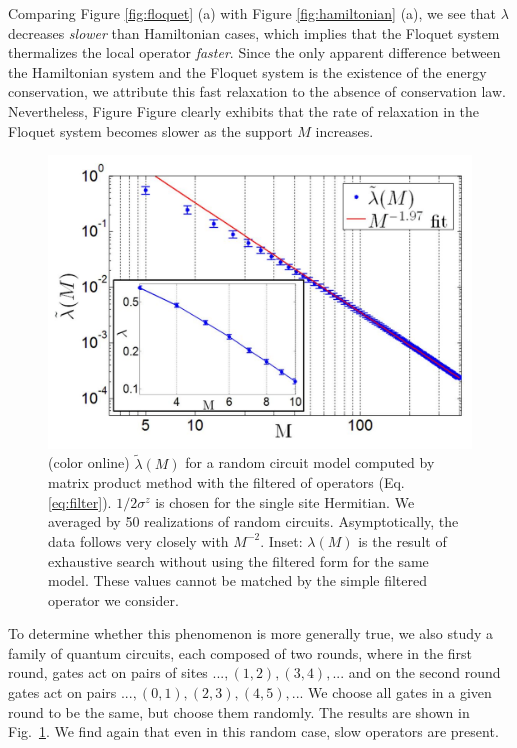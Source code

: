 \documentclass[twocolumn,superscriptaddress, prb]{revtex4-1}
\begin{document}
Comparing Figure \ref{fig:floquet} (a) with Figure \ref{fig:hamiltonian} (a),
we see that $\lambda$ decreases {\it slower} than Hamiltonian cases, which implies that the Floquet system thermalizes
the local operator {\it faster}. Since the only apparent difference between the Hamiltonian system and the Floquet system
is the existence of the energy conservation, we attribute this fast relaxation to the absence of conservation law.
Nevertheless, Figure Figure clearly exhibits that the rate of relaxation in the Floquet system
becomes slower as the support $M$ increases.


\begin{figure}
\includegraphics[width=1.0\linewidth]{fig_random_circuit.pdf}
\centering
\caption{ (color online)  $\tilde{\lambda}(M)$ for a random circuit model computed by matrix product method with the filtered of operators (Eq. \eqref{eq:filter}). $1/2\sigma^z$ is chosen for the single site Hermitian. We averaged by 50 realizations of random circuits. Asymptotically, the data follows very closely with $M^{-2}$.
Inset: $\lambda(M)$ is the result of exhaustive search without using the filtered form for the same model.
These values cannot be matched by the simple filtered operator we consider.}
\label{fig:random_circuit}
\end{figure}



To determine whether this phenomenon is more generally true, we also study a family of quantum circuits, each composed of two rounds, where in the first round, gates act on pairs of sites $...,(1,2),(3,4),...$ and on the second round gates act on pairs $...,(0,1),(2,3),(4,5),...$
We choose all gates in a given round to be the same, but choose them randomly.
The results are shown in Fig.~\ref{fig:random_circuit}.
We find again that even in this random case, slow operators are present.
\end{document}
